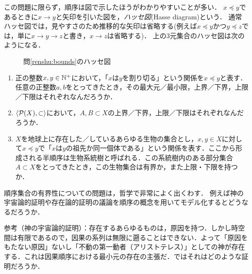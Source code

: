 \documentclass[dvipdfmx,11pt,a4paper]{jsarticle}
\begin{document}
この問題に限らず，順序は図で示したほうがわかりやすいことが多い．
$x \preceq y$であるときに$x \to y$と矢印を引いた図を，\emph{ハッセ図}(Hasse diagram)という．
通常ハッセ図では，見やすさのため推移的な矢印は省略する(例えば$x \preceq y$かつ$y \preceq z$では，単に$x \to y \to z$と書き，$x \to z$は省略する)．
上の3元集合のハッセ図は次のようになる．
\begin{figure}[h]
\centering
{}
\caption{問\ref{renshu:bounds}のハッセ図}
\label{fig:hasse} 
\end{figure}

\begin{renshu}{}{}
\begin{enumerate}
  \item 正の整数$x, y \in \mathbb{N}^+$において，「$x$は$y$を割り切る」という関係を$x \preceq y$と表す．
  任意の正整数$a,b$をとってきたとき，その最大元／最小限，上界／下界，上限／下限はそれぞれなんだろうか．
  \item $\langle \mathcal{P}(X), \subset \rangle$において，$A, B \subset X$の上界／下界，上限／下限はそれぞれなんだろうか．
  \item $X$を地球上に存在した／しているあらゆる生物の集合とし，$x, y \in X$に対して$x \preceq y$で「$x$は$y$の祖先か同一個体である」という関係を表す．ここから形成される半順序は生物系統樹と呼ばれる．この系統樹内のある部分集合$A \subset X$をとってきたとき，この生物集合は有界か，また上限・下限を持つか．
\end{enumerate}
\end{renshu}


\begin{rei}{}{}
順序集合の有界性についての問題は，哲学で非常によく出くわす．
例えば神の宇宙論的証明や存在論的証明の議論を順序の概念を用いてモデル化するとどうなるだろうか．

参考（神の宇宙論的証明）：存在するあらゆるものは，原因を持つ．しかし時空間は有限であるので，因果の系列は無限に遡ることはできない．よって「原因をもたない原因」ないし「不動の第一動者（アリストテレス）」としての神が存在する．これは因果順序における最小元の存在の主張だ．ではそれはどのような証明だろうか．
\end{rei}
\end{document}
